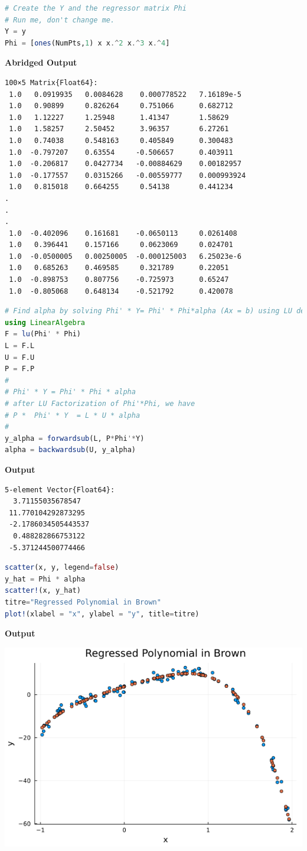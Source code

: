 \begin{lstlisting}[language=Julia,style=mystyle]
# Create the Y and the regressor matrix Phi
# Run me, don't change me.
Y = y
Phi = [ones(NumPts,1) x x.^2 x.^3 x.^4]
\end{lstlisting}
\textbf{Abridged Output} 
\begin{verbatim}
100×5 Matrix{Float64}:
 1.0   0.0919935   0.0084628    0.000778522   7.16189e-5
 1.0   0.90899     0.826264     0.751066      0.682712
 1.0   1.12227     1.25948      1.41347       1.58629
 1.0   1.58257     2.50452      3.96357       6.27261
 1.0   0.74038     0.548163     0.405849      0.300483
 1.0  -0.797207    0.63554     -0.506657      0.403911
 1.0  -0.206817    0.0427734   -0.00884629    0.00182957
 1.0  -0.177557    0.0315266   -0.00559777    0.000993924
 1.0   0.815018    0.664255     0.54138       0.441234
.
.
.
 1.0  -0.402096    0.161681    -0.0650113     0.0261408
 1.0   0.396441    0.157166     0.0623069     0.024701
 1.0  -0.0500005   0.00250005  -0.000125003   6.25023e-6
 1.0   0.685263    0.469585     0.321789      0.22051
 1.0  -0.898753    0.807756    -0.725973      0.65247
 1.0  -0.805068    0.648134    -0.521792      0.420078
\end{verbatim}


\begin{lstlisting}[language=Julia,style=mystyle]
# Find alpha by solving Phi' * Y= Phi' * Phi*alpha (Ax = b) using LU decomposition
using LinearAlgebra
F = lu(Phi' * Phi)
L = F.L
U = F.U
P = F.P
#
# Phi' * Y = Phi' * Phi * alpha
# after LU Factorization of Phi'*Phi, we have
# P *  Phi' * Y  = L * U * alpha
# 
y_alpha = forwardsub(L, P*Phi'*Y)
alpha = backwardsub(U, y_alpha)
\end{lstlisting}
\textbf{Output} 
\begin{verbatim}
5-element Vector{Float64}:
  3.71155035678547
 11.770104292873295
 -2.1786034505443537
  0.488282866753122
 -5.371244500774466
\end{verbatim}

\begin{lstlisting}[language=Julia,style=mystyle]
scatter(x, y, legend=false)
y_hat = Phi * alpha
scatter!(x, y_hat)
titre="Regressed Polynomial in Brown"
plot!(xlabel = "x", ylabel = "y", title=titre)
\end{lstlisting}
\textbf{Output} 


\includegraphics[width=0.7\columnwidth]{graphics/Chap06/PolyScatterPlotOverlay.png}

